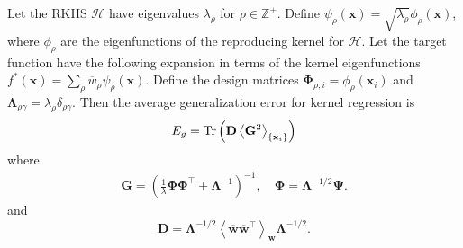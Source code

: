 \documentclass{article}
\begin{document}
Let the RKHS $\mathcal{H}$ have eigenvalues $\lambda_\rho$ for $\rho \in \mathbb{Z}^+$. Define $\psi_\rho(\mathbf{x}) = \sqrt{\lambda_\rho} \phi_\rho(\mathbf{x})$, where $\phi_\rho$ are the eigenfunctions of the reproducing kernel for $\mathcal{H}$. Let the target function have the following expansion in terms of the kernel eigenfunctions $f^*(\mathbf{x}) = \sum_{\rho} \overline{w}_\rho \psi_\rho(\mathbf{x})$. Define the design matrices $\mathbf{\Phi}_{\rho, i} = \phi_\rho(\mathbf{x}_i)$ and $\mathbf{\Lambda}_{\rho \gamma} = \lambda_\rho \delta_{\rho \gamma}$.
Then the average generalization error for kernel regression is
%
\begin{equation}\label{mainEg_SI}
    E_g = {\rm Tr} \left(\mathbf{D} \left< \mathbf{G}^2 \right>_{\{\mathbf{x}_i \}} \right)
\end{equation}
where 
\begin{align}
    \mathbf{G} = \left (\frac{1}{\lambda} \mathbf{\Phi} \mathbf{\Phi}^\top + \mathbf{\Lambda}^{-1} \right)^{-1},\quad  \mathbf{\Phi} = \mathbf{\Lambda}^{-1/2} \mathbf{\Psi}.
\end{align}
 and 
 \begin{equation}
    \mathbf{D} = \mathbf{\Lambda}^{-1/2} \left< \mathbf{\overline{w}}\mathbf{\overline{w}}^\top \right>_{\mathbf{\overline{w}}} \mathbf{\Lambda}^{-1/2}.
\end{equation}
\end{document}
